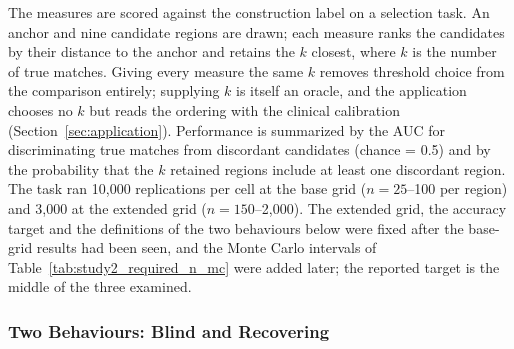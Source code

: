\documentclass[AMA,Times1COL]{WileyNJDv5}
\begin{document}
The measures are scored against the construction label on a selection task. An anchor and nine candidate regions are drawn; each measure ranks the candidates by their distance to the anchor and retains the $k$ closest, where $k$ is the number of true matches. Giving every measure the same $k$ removes threshold choice from the comparison entirely; supplying $k$ is itself an oracle, and the application chooses no $k$ but reads the ordering with the clinical calibration (Section~\ref{sec:application}). Performance is summarized by the AUC for discriminating true matches from discordant candidates (chance = 0.5) and by the probability that the $k$ retained regions include at least one discordant region. The task ran 10{,}000 replications per cell at the base grid ($n = 25$--100 per region) and 3{,}000 at the extended grid ($n = 150$--2{,}000). The extended grid, the accuracy target and the definitions of the two behaviours below were fixed after the base-grid results had been seen, and the Monte Carlo intervals of Table~\ref{tab:study2_required_n_mc} were added later; the reported target is the middle of the three examined.

\subsubsection{Two Behaviours: Blind and Recovering}\label{sec:study1_classification}
\end{document}

